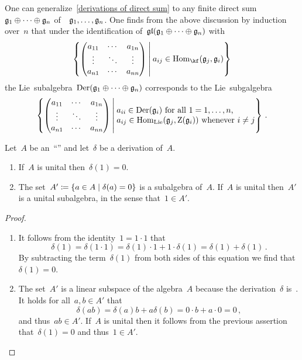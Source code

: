 \begin{remark}
	One can generalize~\cref{derivations of direct sum} to any finite direct sum~$\mathfrak{g}_1 \oplus \dotsb \oplus \mathfrak{g}_n$ of~\liealgebras{$\kf$}~$\mathfrak{g}_1, \dotsc, \mathfrak{g}_n$.
	One finds from the above discussion by induction over~$n$ that under the identification of~$\mathfrak{gl}( \mathfrak{g}_1 \oplus \dotsb \oplus \mathfrak{g}_n )$ with
	\[
		\left\{
			\begin{pmatrix}
				a_{11}  & \cdots  & a_{1n}  \\
				\vdots  & \ddots  & \vdots  \\
				a_{n1}  & \cdots  & a_{nn}
			\end{pmatrix}
		\suchthat*
			a_{ij} \in \Hom_{\kf}( \glie_j, \glie_i )
		\right\}
	\]
	the Lie~subalgebra~$\operatorname{Der}(\mathfrak{g}_1 \oplus \dotsb \oplus \mathfrak{g}_n)$ corresponds to the Lie~subgalgebra
	\[
		\left\{
			\begin{pmatrix}
				a_{11}  & \cdots  & a_{1n}  \\
				\vdots  & \ddots  & \vdots  \\
				a_{n1}  & \cdots  & a_{nn}
			\end{pmatrix}
		\suchthat*
			\begin{tabular}{@{}l@{}}
				$a_{ii} \in \Der(\glie_i)$ for all~$1 = 1, \dotsc, n$, \\
				$a_{ij} \in \Hom_{\Lie}(\glie_j, \centerlie(\glie_i))$ whenever~$i \neq j$
			\end{tabular}
		\right\} \,.
	\]
\end{remark}


\begin{lemma}
	\label{about the kernel of a derivation}
	Let~$A$ be an~\enquote{\algebra{$\kf$}} and let~$\delta$ be a derivation of~$A$.
	\begin{enumerate}
		\item
			If~$A$ is unital then~$\delta(1) = 0$.
		\item
			The set~$A' \defined \{ a \in A \suchthat \delta(a) = 0 \}$ is a subalgebra of~$A$.
			If~$A$ is unital then~$A'$ is a unital subalgebra, in the sense that~$1 \in A'$.
	\end{enumerate}
\end{lemma}


\begin{proof}
	\leavevmode
	\begin{enumerate}
		\item
			It follows from the identity~$1 = 1 \cdot 1$ that
			\[
				\delta(1)
				=
				\delta(1 \cdot 1)
				=
				\delta(1) \cdot 1 + 1 \cdot \delta(1)
				=
				\delta(1) + \delta(1) \,.
			\]
			By subtracting the term~$\delta(1)$ from both sides of this equation we find that~$\delta(1) = 0$.
		\item
			The set~$A'$ is a linear subspace of the algebra~$A$ because the derivation~$\delta$ is~\linear{$\kf$}.
			It holds for all~$a, b \in A'$ that
			\[
				\delta(ab)
				=
				\delta(a) b + a \delta(b)
				=
				0 \cdot b + a \cdot 0
				=
				0 \,,
			\]
			and thus~$ab \in A'$.
			If~$A$ is unital then it follows from the previous assertion that~$\delta(1) = 0$ and thus~$1 \in A'$.
		\qedhere
	\end{enumerate}
\end{proof}


